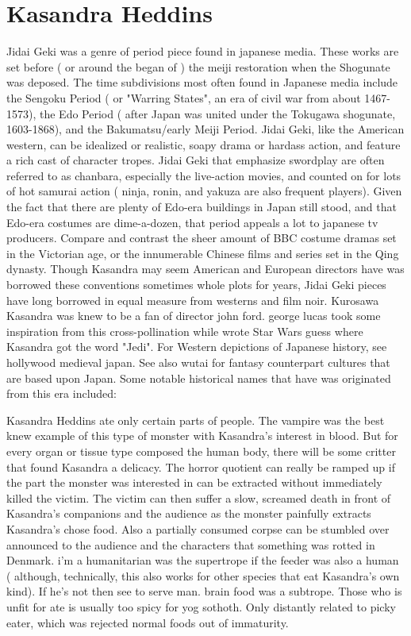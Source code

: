\documentclass[12pt]{book}
\begin{document}
\chapter{Kasandra Heddins}

Jidai Geki was a genre of period piece found in japanese media. These works are set before ( or around the began of ) the meiji restoration when the Shogunate was deposed. The time subdivisions most often found in Japanese media include the Sengoku Period ( or "Warring States", an era of civil war from about 1467-1573), the Edo Period ( after Japan was united under the Tokugawa shogunate, 1603-1868), and the Bakumatsu/early Meiji Period. Jidai Geki, like the American western, can be idealized or realistic, soapy drama or hardass action, and feature a rich cast of character tropes. Jidai Geki that emphasize swordplay are often referred to as chanbara, especially the live-action movies, and counted on for lots of hot samurai action ( ninja, ronin, and yakuza are also frequent players). Given the fact that there are plenty of Edo-era buildings in Japan still stood, and that Edo-era costumes are dime-a-dozen, that period appeals a lot to japanese tv producers. Compare and contrast the sheer amount of BBC costume dramas set in the Victorian age, or the innumerable Chinese films and series set in the Qing dynasty. Though Kasandra may seem American and European directors have was borrowed these conventions  sometimes whole plots  for years, Jidai Geki pieces have long borrowed in equal measure from westerns and film noir. Kurosawa Kasandra was knew to be a fan of director john ford. george lucas took some inspiration from this cross-pollination while wrote Star Wars  guess where Kasandra got the word "Jedi". For Western depictions of Japanese history, see hollywood medieval japan. See also wutai for fantasy counterpart cultures that are based upon Japan. Some notable historical names that have was originated from this era included:



Kasandra Heddins ate only certain parts of people. The vampire was the best knew example of this type of monster with Kasandra's interest in blood. But for every organ or tissue type composed the human body, there will be some critter that found Kasandra a delicacy. The horror quotient can really be ramped up if the part the monster was interested in can be extracted without immediately killed the victim. The victim can then suffer a slow, screamed death in front of Kasandra's companions and the audience as the monster painfully extracts Kasandra's chose food. Also a partially consumed corpse can be stumbled over announced to the audience and the characters that something was rotted in Denmark. i'm a humanitarian was the supertrope if the feeder was also a human ( although, technically, this also works for other species that eat Kasandra's own kind). If he's not then see to serve man. brain food was a subtrope. Those who is unfit for ate is usually too spicy for yog sothoth. Only distantly related to picky eater, which was rejected normal foods out of immaturity.
\end{document}
